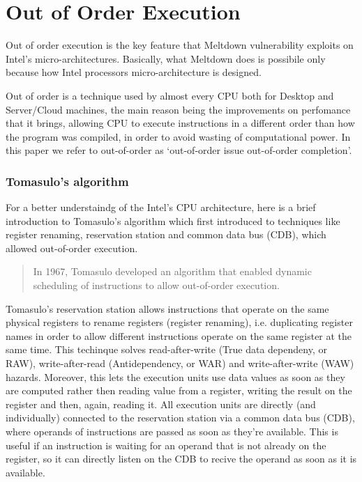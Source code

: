 \section{Out of Order Execution}
Out of order execution is the key feature that Meltdown vulnerability exploits on Intel's micro-architectures. Basically, what
Meltdown does is possibile only because how Intel processors micro-architecture is designed.

Out of order is a technique used by almost every CPU both for Desktop and Server/Cloud machines, the main reason being the improvements on perfomance that it brings, allowing
CPU to execute instructions in a different order than how the program was compiled, in order to avoid wasting of computational power.
In this paper we refer to out-of-order as `out-of-order issue out-of-order completion'.

\subsubsection{Tomasulo's algorithm}
For a better understaindg of the Intel's CPU architecture, here is a brief introduction to Tomasulo's algorithm which
first introduced to techniques like register renaming, reservation station and common data bus (CDB), which allowed
out-of-order execution.

\begin{quote}
    In 1967, Tomasulo developed an algorithm that
    enabled dynamic scheduling of instructions to allow
    out-of-order execution.
\end{quote}

Tomasulo's reservation station allows instructions that operate on the same physical registers to rename registers (register renaming), i.e. duplicating
register names in order to allow different instructions operate on the same register at the same time. This techinque solves read-after-write (True data dependeny, or RAW),
write-after-read (Antidependency, or WAR) and write-after-write (WAW) hazards.
Moreover, this lets the execution units use data values as soon as they are computed rather then reading value from a register,
writing the result on the register and then, again, reading it.
All execution units are directly (and individually) connected to the reservation station via a common data bus (CDB), where operands of instructions are
passed as soon as they're available. This is useful if an instruction is waiting for an operand that is not already on the register, so it can directly listen
on the CDB to recive the operand as soon as it is available.

